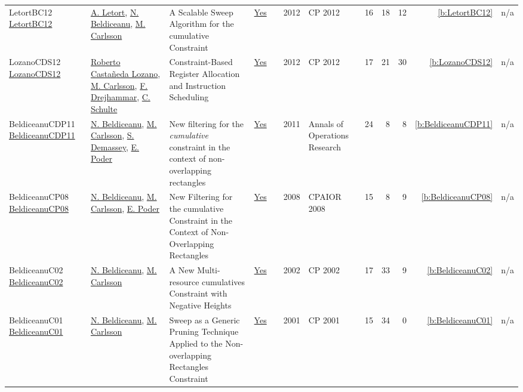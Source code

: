 {\begin{longtable}{>{\raggedright\arraybackslash}p{3cm}>{\raggedright\arraybackslash}p{6cm}>{\raggedright\arraybackslash}p{6.5cm}rrrp{2.5cm}rrrrr}
LetortBC12 \href{https://doi.org/10.1007/978-3-642-33558-7_33}{LetortBC12} & \hyperref[auth:a128]{A. Letort}, \hyperref[auth:a129]{N. Beldiceanu}, \hyperref[auth:a91]{M. Carlsson} & A Scalable Sweep Algorithm for the cumulative Constraint & \href{../works/LetortBC12.pdf}{Yes} & \cite{LetortBC12} & 2012 & CP 2012 & 16 & 18 & 12 & \ref{b:LetortBC12} & n/a\\
LozanoCDS12 \href{https://doi.org/10.1007/978-3-642-33558-7_54}{LozanoCDS12} & \hyperref[auth:a1245]{Roberto Casta{\~{n}}eda Lozano}, \hyperref[auth:a91]{M. Carlsson}, \hyperref[auth:a1246]{F. Drejhammar}, \hyperref[auth:a92]{C. Schulte} & Constraint-Based Register Allocation and Instruction Scheduling & \href{../works/LozanoCDS12.pdf}{Yes} & \cite{LozanoCDS12} & 2012 & CP 2012 & 17 & 21 & 30 & \ref{b:LozanoCDS12} & n/a\\
BeldiceanuCDP11 \href{https://doi.org/10.1007/s10479-010-0731-0}{BeldiceanuCDP11} & \hyperref[auth:a129]{N. Beldiceanu}, \hyperref[auth:a91]{M. Carlsson}, \hyperref[auth:a245]{S. Demassey}, \hyperref[auth:a361]{E. Poder} & New filtering for the \emph{cumulative} constraint in the context of non-overlapping rectangles & \href{../works/BeldiceanuCDP11.pdf}{Yes} & \cite{BeldiceanuCDP11} & 2011 & Annals of Operations Research & 24 & 8 & 8 & \ref{b:BeldiceanuCDP11} & n/a\\
BeldiceanuCP08 \href{https://doi.org/10.1007/978-3-540-68155-7_5}{BeldiceanuCP08} & \hyperref[auth:a129]{N. Beldiceanu}, \hyperref[auth:a91]{M. Carlsson}, \hyperref[auth:a361]{E. Poder} & New Filtering for the cumulative Constraint in the Context of Non-Overlapping Rectangles & \href{../works/BeldiceanuCP08.pdf}{Yes} & \cite{BeldiceanuCP08} & 2008 & CPAIOR 2008 & 15 & 8 & 9 & \ref{b:BeldiceanuCP08} & n/a\\
BeldiceanuC02 \href{https://doi.org/10.1007/3-540-46135-3_5}{BeldiceanuC02} & \hyperref[auth:a129]{N. Beldiceanu}, \hyperref[auth:a91]{M. Carlsson} & A New Multi-resource cumulatives Constraint with Negative Heights & \href{../works/BeldiceanuC02.pdf}{Yes} & \cite{BeldiceanuC02} & 2002 & CP 2002 & 17 & 33 & 9 & \ref{b:BeldiceanuC02} & n/a\\
BeldiceanuC01 \href{https://doi.org/10.1007/3-540-45578-7_26}{BeldiceanuC01} & \hyperref[auth:a129]{N. Beldiceanu}, \hyperref[auth:a91]{M. Carlsson} & Sweep as a Generic Pruning Technique Applied to the Non-overlapping Rectangles Constraint & \href{../works/BeldiceanuC01.pdf}{Yes} & \cite{BeldiceanuC01} & 2001 & CP 2001 & 15 & 34 & 0 & \ref{b:BeldiceanuC01} & n/a\\
\end{longtable}
}


